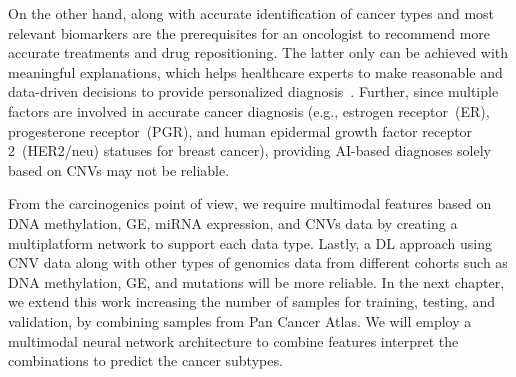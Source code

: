 \hspace*{3.5mm} On the other hand, along with accurate identification of cancer types and most relevant biomarkers are the prerequisites for an oncologist to recommend more accurate treatments and drug repositioning. The latter only can be achieved with meaningful explanations, which helps healthcare experts to make reasonable and data-driven decisions to provide personalized diagnosis~\cite{stiglic2020interpretability}.  
Further, since multiple factors are involved in accurate cancer diagnosis (e.g., estrogen receptor~(ER), progesterone receptor~(PGR), and human epidermal growth factor receptor 2~(HER2/neu) statuses for breast cancer), providing AI-based diagnoses solely based on CNVs may not be reliable.

\hspace*{3.5mm} From the carcinogenics point of view, we require multimodal features based on DNA methylation, GE, miRNA expression, and CNVs data by creating a multiplatform network to support each data type. Lastly, a DL approach using CNV data along with other types of genomics data from different cohorts such as DNA methylation, GE, and mutations will be more reliable. In the next chapter, we extend this work increasing the number of samples for training, testing, and validation, by combining samples from Pan Cancer Atlas. We will employ a multimodal neural network architecture to combine features interpret the combinations to predict the cancer subtypes. 
